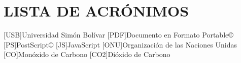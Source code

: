 \chapter*{LISTA DE ACRÓNIMOS}

\begin{acronym}

[USB]{Universidad Simón Bolívar}
[PDF]{Documento en Formato Portable\copyright}
[PS]{PostScript\copyright}
[JS]{JavaScript}
[ONU]{Organización de las Naciones Unidas}
[CO]{Monóxido de Carbono}
[CO2]{Dióxido de Carbono}

\end{acronym}
\clearpage